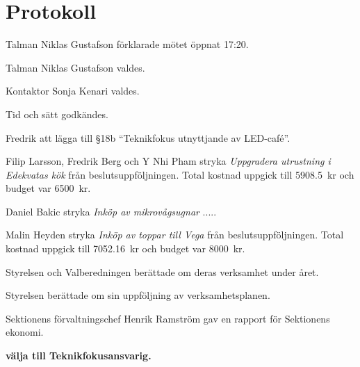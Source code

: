 \documentclass[10pt]{article}
\def\mo{Niklas Gustafson}
\def\ms{Sonja Kenari}
\begin{document}
\section*{Protokoll}
\begin{paragrafer}
Talman {\mo} förklarade mötet öppnat 17:20.

Talman {\mo} valdes.

Kontaktor {\ms} valdes.

Tid och sätt godkändes.

\valavj


Fredrik \ypa att lägga till \S18b ``Teknikfokus utnyttjande av LED-café''.



Filip Larsson, Fredrik Berg och Y Nhi Pham \ypa stryka \emph{Uppgradera utrustning i Edekvatas kök} från beslutsuppföljningen. 
    Total kostnad uppgick till \SI{5908,5}{kr} och budget var \SI{6500}{kr}.

\Mbaby

Daniel Bakic \ypa stryka \emph{Inköp av mikrovågsugnar} .....

\Mba

Malin Heyden \ypa stryka \emph{Inköp av toppar till Vega} från beslutsuppföljningen. 
    Total kostnad uppgick till \SI{7052,16}{kr} och budget var \SI{8000}{kr}. 
\Mbaby

Styrelsen och Valberedningen berättade om deras verksamhet under året.

Styrelsen berättade om sin uppföljning av verksamhetsplanen.

Sektionens förvaltningschef Henrik Ramström gav en rapport för Sektionens ekonomi.


\textbf{\Mba välja  till Teknikfokusansvarig.}\par


\end{paragrafer}
\end{document}
